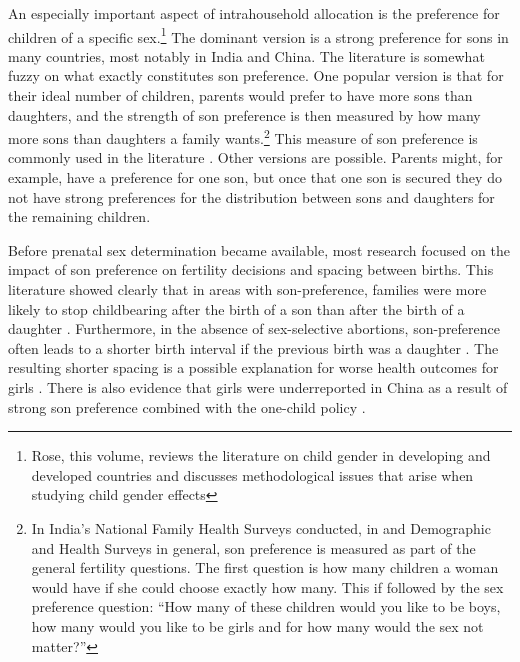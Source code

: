 An especially important aspect of intrahousehold allocation is the preference for children of a specific sex.\footnote{Rose, this volume, reviews the literature on child gender in developing and developed countries and discusses methodological issues that arise when studying child gender effects} The dominant version is a strong preference for sons in many countries, most notably in India and China. The literature is somewhat fuzzy on what exactly constitutes son preference. One popular version is that for their ideal number of children, parents would prefer to have more sons than daughters, and the strength of son preference is then measured by how many more sons than daughters a family wants.\footnote{In India's National Family Health Surveys conducted, in and Demographic and Health Surveys in general, son preference is measured as part of the general fertility questions. The first question is how many children a woman would have if she could choose exactly how many. This if followed by the sex preference question: ``How many of these children would you like to be boys, how many would you like to be girls and for how many would the sex not matter?''} This measure of son preference is commonly used in the literature \citep[e.g.]{clark00,Jensen2009,Hu2015}. Other versions are possible. Parents might, for example, have a preference for one son, but once that one son is secured they do not have strong preferences for the distribution between sons and daughters for the remaining children.

Before prenatal sex determination became available, most research focused on the impact of son preference on fertility decisions and spacing between births. This literature showed clearly that in areas with son-preference, families were more likely to stop childbearing after the birth of a son than after the birth of a daughter \citep[see, for
example,][]{Das1987,Arnold1997,clark00,filmer09}. Furthermore, in the absence of sex-selective abortions, son-preference often leads to a shorter birth interval if the previous birth was a daughter \citep[see, for
example,][]{Das1987,Rahman1993,Pong1994,Haughton1996,Arnold1997}. The resulting shorter spacing is a possible explanation for worse health outcomes for girls \citep{arnold98,Whitworth2002,Rutstein2005,Conde-Agudelo2006}. There is also evidence that girls were underreported in China as a result of strong son preference combined with the one-child policy \citep{Merli2000,Goodkind2011}.

